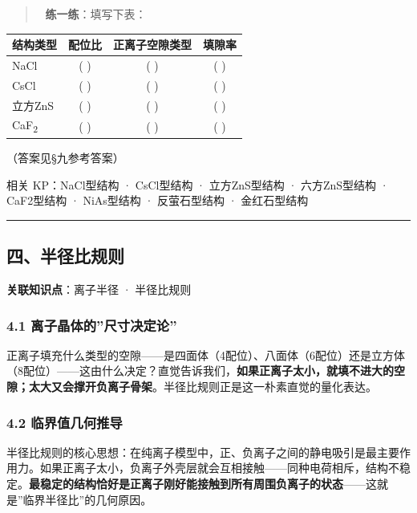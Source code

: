 \begin{quote}
📝 \textbf{练一练}：填写下表：
\end{quote}

{\def\LTcaptype{none} %
\begin{longtable}[]{@{}lccc@{}}
\toprule\noalign{}
结构类型 & 配位比 & 正离子空隙类型 & 填隙率 \\
\midrule\noalign{}
\endhead
\bottomrule\noalign{}
\endlastfoot
NaCl & ( ) & ( ) & ( ) \\
CsCl & ( ) & ( ) & ( ) \\
立方ZnS & ( ) & ( ) & ( ) \\
CaF\textsubscript{2} & ( ) & ( ) & ( ) \\
\end{longtable}
}

（答案见§九参考答案）

相关 KP：NaCl型结构 · CsCl型结构 · 立方ZnS型结构 · 六方ZnS型结构 · CaF2型结构 · NiAs型结构 · 反萤石型结构 · 金红石型结构

\begin{center}\rule{0.5\linewidth}{0.5pt}\end{center}

\subsection{四、半径比规则}\label{ux56dbux534aux5f84ux6bd4ux89c4ux5219}

\textbf{关联知识点}：离子半径 · 半径比规则

\subsubsection{4.1 离子晶体的''尺寸决定论''}\label{ux79bbux5b50ux6676ux4f53ux7684ux5c3aux5bf8ux51b3ux5b9aux8bba}

正离子填充什么类型的空隙------是四面体（4配位）、八面体（6配位）还是立方体（8配位）------这由什么决定？直觉告诉我们，\textbf{如果正离子太小，就填不进大的空隙；太大又会撑开负离子骨架}。半径比规则正是这一朴素直觉的量化表达。

\subsubsection{4.2 临界值几何推导}\label{ux4e34ux754cux503cux51e0ux4f55ux63a8ux5bfc}

半径比规则的核心思想：在纯离子模型中，正、负离子之间的静电吸引是最主要作用力。如果正离子太小，负离子外壳层就会互相接触------同种电荷相斥，结构不稳定。\textbf{最稳定的结构恰好是正离子刚好能接触到所有周围负离子的状态}------这就是''临界半径比''的几何原因。

